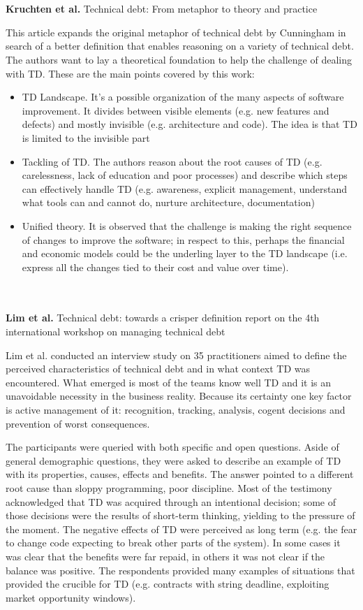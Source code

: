 \\
\\
\textbf{Kruchten et al.} \cite{kruchten2012technical} Technical debt: From metaphor to theory and practice

This article expands the original metaphor of technical debt by Cunningham in search of a better definition that enables reasoning on a variety of technical debt.
The authors want to lay a theoretical foundation to help the challenge of dealing with TD. These are the main points covered by this work:
\begin{itemize}
    \item TD Landscape. It's a possible organization of the many aspects of software improvement. It divides between visible elements (e.g. new features and defects) and mostly invisible (e.g. architecture and code). The idea is that TD is limited to the invisible part
    \item Tackling of TD. The authors reason about the root causes of TD (e.g. carelessness, lack of education and poor processes) and describe which steps can effectively handle TD (e.g. awareness, explicit management, understand what tools can and cannot do, nurture architecture, documentation)
    \item Unified theory. It is observed that the challenge is making the right sequence of changes to improve the software; in respect to this, perhaps the financial and economic models could be the underling layer to the TD landscape (i.e. express all the changes tied to their cost and value over time).
\end{itemize}
\\
\\
\textbf{Lim et al.} \cite{lim2012balancing} Technical debt: towards a crisper definition report on the 4th international workshop on managing technical debt
 
Lim et al. conducted an interview study on 35 practitioners aimed to define the perceived characteristics of technical debt and in what context TD was encountered. What emerged is most of the teams know well TD and it is an unavoidable necessity in the business reality. Because its certainty one key factor is active management of it: recognition, tracking, analysis, cogent decisions and prevention of worst consequences.
 
The participants were queried with both specific and open questions. Aside of general demographic questions, they were asked to describe an example of TD with its properties, causes, effects and benefits. 
The answer pointed to a different root cause than sloppy programming, poor discipline. Most of the testimony acknowledged that TD was acquired through an intentional decision; some of those decisions were the results of short-term thinking, yielding to the pressure of the moment.
The negative effects of TD were perceived as long term (e.g. the fear to change code expecting to break other parts of the system). 
In some cases it was clear that the benefits were far repaid, in others it was not clear if the balance was positive.
The respondents provided many examples of situations that provided the crucible for TD (e.g. contracts with string deadline, exploiting market opportunity windows). 

